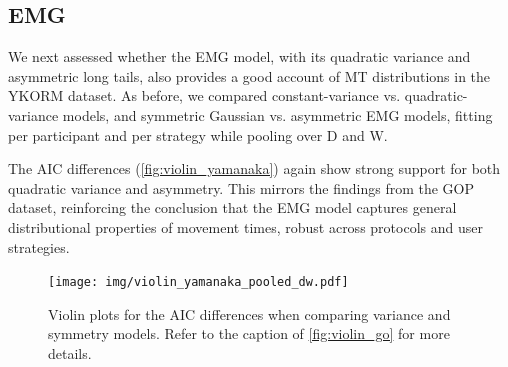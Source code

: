 \documentclass[acmlarge, manuscript,review]{acmart}
\newcommand{\ide}{\ensuremath{{\text{ID}_e}}\xspace}
\begin{document}

\subsection{EMG}
We next assessed whether the EMG model, with its quadratic variance and asymmetric long tails, also provides a good account of MT distributions in the YKORM dataset. As before, we compared constant-variance vs. quadratic-variance models, and symmetric Gaussian vs. asymmetric EMG models, fitting per participant and per strategy while pooling over D and W.

The AIC differences (\autoref{fig:violin_yamanaka}) again show strong support for both quadratic variance and asymmetry. This mirrors the findings from the GOP dataset, reinforcing the conclusion that the EMG model captures general distributional properties of movement times, robust across protocols and user strategies.

\begin{figure}[htbp]
	\centering
	\texttt{[image: img/violin\_yamanaka\_pooled\_dw.pdf]}
	\caption{Violin plots for the AIC differences when comparing variance and symmetry models. Refer to the caption of \autoref{fig:violin_go} for more details.}
	\label{fig:violin_yamanaka}
\end{figure}
\end{document}

